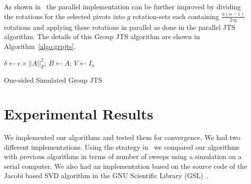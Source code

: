 \documentclass[10pt, conference, compsocconf]{IEEEtran}
\begin{document}
As shown in~\cite{rajasekaran2008relaxation} the parallel implementation can be further improved by dividing the rotations for the selected pivots into $g$ rotation-sets each containing $\frac{n(n-1)}{2\tau g}$ rotations and applying these rotations in parallel as done in the parallel JTS algorithm. The details of this Group JTS algorithm are shown in Algorithm~\ref{algo:grpjts}.


\begin{algorithm}
$\delta \gets \epsilon \times ||A||^2_F$; \quad $B \gets A$; \quad $V \gets I_n$\;
\caption{One-sided Simulated Group JTS}
\label{algo:grpjts}
\end{algorithm}



\section{Experimental Results}
\label{sec:results}

We implemented our algorithms and tested them for convergence. We had two different implementations. Using the strategy in~\cite{rajasekaran2008relaxation} we compared our algorithms with previous algorithms in terms of number of sweeps using a simulation on a serial computer. We also had an implementation based on the source code of the Jacobi based SVD algorithm in the GNU Scientific Library (GSL)~\cite{galassi1996gnu}.
\end{document}
